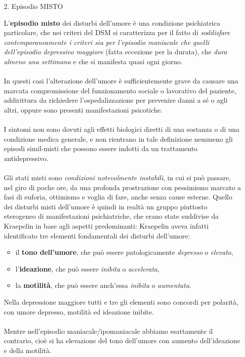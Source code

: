 \begin{itemize}
\item[2.]
Episodio MISTO

L'\textbf{episodio misto} dei disturbi dell'umore è una condizione
psichiatrica particolare, che nei criteri del DSM si caratterizza per il
fatto di \emph{soddisfare contemporaneamente i criteri sia per
l'episodio maniacale che quelli dell'episodio depressivo maggiore}
(fatta eccezione per la durata), che \emph{dura almeno una settimana} e
che si manifesta quasi ogni giorno.
\\\\
In questi casi l'alterazione dell'umore è sufficientemente grave da
causare una marcata compromissione del funzionamento sociale o
lavorativo del paziente, addirittura da richiedere l'ospedalizzazione
per prevenire danni a sé o agli altri, oppure sono presenti
manifestazioni psicotiche.
\\\\
I sintomi non sono dovuti agli effetti biologici diretti di una sostanza
o di una condizione medica generale, e non rientrano in tale definizione
nemmeno gli episodi simil-misti che possono essere indotti da un
trattamento antidepressivo.
\\\\
Gli stati misti sono \emph{condizioni notevolmente instabili}, in cui si
può passare, nel giro di poche ore, da una profonda prostrazione con
pessimismo marcato a fasi di euforia, ottimismo e voglia di fare, anche
senza cause esterne. Quello dei disturbi misti dell'umore è quindi in
realtà un gruppo piuttosto eterogeneo di manifestazioni psichiatriche,
che erano state suddivise da Kraepelin in base agli aspetti
predominanti: Kraepelin aveva infatti identificato tre elementi
fondamentali dei disturbi dell'umore:

\begin{itemize}
\item
  il \textbf{tono dell'umore}, che può essere patologicamente
  \emph{depresso} o \emph{elevato},
\item
  l'\textbf{ideazione}, che può essere \emph{inibita} o
  \emph{accelerata},
\item
  la \textbf{motilità}, che può essere anch'essa \emph{inibita} o
  \emph{aumentata}.
\end{itemize}

Nella depressione maggiore tutti e tre gli elementi sono concordi per
polarità, con umore depresso, motilità ed ideazione inibite.
\\\\
Mentre nell'episodio maniacale/ipomaniacale abbiamo esattamente il
contrario, cioè si ha elevazione del tono dell'umore con aumento
dell'ideazione e della motilità.


\end{itemize}
